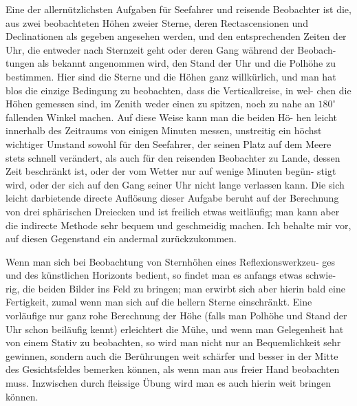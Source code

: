 \documentclass[12pt,a4paper]{article}
\begin{document}
Eine der allernützlichsten Aufgaben für Seefahrer und reisende Beobachter
ist die, aus zwei beobachteten Höhen zweier Sterne, deren Rectascensionen und
Declinationen als gegeben angesehen werden, und den entsprechenden Zeiten der
Uhr, die entweder nach Sternzeit geht oder deren Gang während der Beobach-
tungen als bekannt angenommen wird, den Stand der Uhr und die Polhöhe zu
bestimmen. Hier sind die Sterne und die Höhen ganz willkürlich, und man
hat blos die einzige Bedingung zu beobachten, dass die Verticalkreise, in wel-
chen die Höhen gemessen sind, im Zenith weder einen zu spitzen, noch zu nahe
an $180^{\circ}$ fallenden Winkel machen. Auf diese Weise kann man die beiden Hö-
hen leicht innerhalb des Zeitraums von einigen Minuten messen, unstreitig ein
höchst wichtiger Umstand sowohl für den Seefahrer, der seinen Platz auf dem
Meere stets schnell verändert, als auch für den reisenden Beobachter zu Lande,
dessen Zeit beschränkt ist, oder der vom Wetter nur auf wenige Minuten begün-
stigt wird, oder der sich auf den Gang seiner Uhr nicht lange verlassen kann.
Die sich leicht darbietende directe Auflösung dieser Aufgabe beruht auf der
Berechnung von drei sphärischen Dreiecken und ist freilich etwas weitläufig; man
kann aber die indirecte Methode sehr bequem und geschmeidig machen. Ich
behalte mir vor, auf diesen Gegenstand ein andermal zurückzukommen.

Wenn man sich bei Beobachtung von Sternhöhen eines Reflexionswerkzeu-
ges und des künstlichen Horizonts bedient, so findet man es anfangs etwas schwie-
rig, die beiden Bilder ins Feld zu bringen; man erwirbt sich aber hierin bald
eine Fertigkeit, zumal wenn man sich auf die hellern Sterne einschränkt. Eine
vorläufige nur ganz rohe Berechnung der Höhe (falls man Polhöhe und Stand der
Uhr schon beiläufig kennt) erleichtert die Mühe, und wenn man Gelegenheit hat
von einem Stativ zu beobachten, so wird man nicht nur an Bequemlichkeit sehr
gewinnen, sondern auch die Berührungen weit schärfer und besser in der Mitte
des Gesichtsfeldes bemerken können, als wenn man aus freier Hand beobachten
muss. Inzwischen durch fleissige Übung wird man es auch hierin weit bringen
können.
\end{document}
